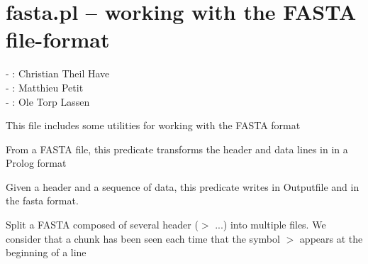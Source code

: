


\section{fasta.pl -- working with the FASTA file-format}

\label{sec:fasta}

\begin{tags}
- : Christian Theil Have \\- : Matthieu Petit \\- : Ole Torp Lassen
\end{tags}

This file includes some utilities for working with the FASTA format\vspace{0.7cm}

\begin{description}
From a FASTA file, this predicate transforms the header and data lines in
in a Prolog format

Given a header and a sequence of data, this predicate
writes in Outputfile  and  in the fasta
format.

Split a FASTA composed of several header ($>$ ...) into multiple files. We consider that a chunk
has been seen each time that the symbol $>$ appears at the beginning of a line
\end{description}

